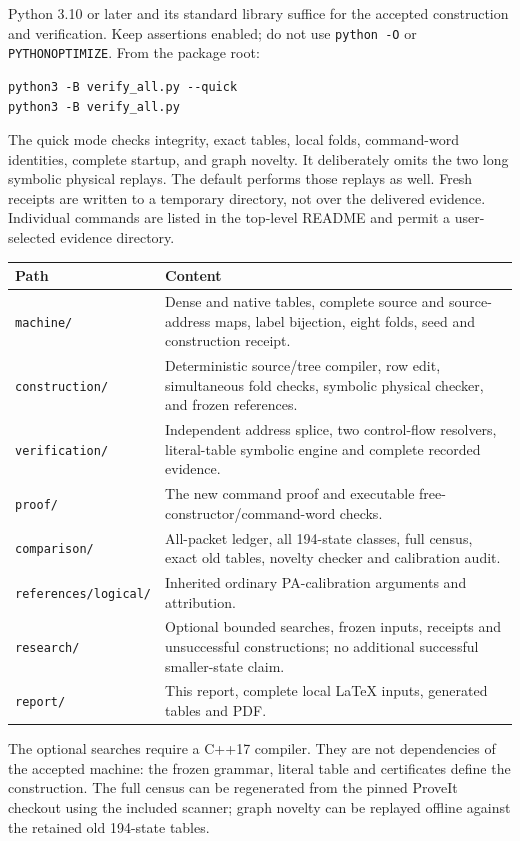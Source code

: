 \documentclass[11pt,letterpaper]{article}
\newcommand{\file}[1]{\texttt{\nolinkurl{#1}}}
\begin{document}
Python 3.10 or later and its standard library suffice for the accepted
construction and verification. Keep assertions enabled; do not use
\file{python -O} or \file{PYTHONOPTIMIZE}. From the package root:
\begin{verbatim}
python3 -B verify_all.py --quick
python3 -B verify_all.py
\end{verbatim}
The quick mode checks integrity, exact tables, local folds, command-word
identities, complete startup, and graph novelty. It deliberately omits
the two long symbolic physical replays. The default performs those
replays as well. Fresh receipts are written to a temporary directory,
not over the delivered evidence. Individual commands are listed in the
top-level README and permit a user-selected evidence directory.

\begin{center}\small
\begin{tabularx}{\linewidth}{@{}lX@{}}
\toprule
Path & Content\\\midrule
\file{machine/} & Dense and native tables, complete source and source-address maps, label bijection, eight folds, seed and construction receipt.\\
\file{construction/} & Deterministic source/tree compiler, row edit, simultaneous fold checks, symbolic physical checker, and frozen references.\\
\file{verification/} & Independent address splice, two control-flow resolvers, literal-table symbolic engine and complete recorded evidence.\\
\file{proof/} & The new command proof and executable free-constructor/command-word checks.\\
\file{comparison/} & All-packet ledger, all 194-state classes, full census, exact old tables, novelty checker and calibration audit.\\
\file{references/logical/} & Inherited ordinary PA-calibration arguments and attribution.\\
\file{research/} & Optional bounded searches, frozen inputs, receipts and unsuccessful constructions; no additional successful smaller-state claim.\\
\file{report/} & This report, complete local LaTeX inputs, generated tables and PDF.\\
\bottomrule
\end{tabularx}
\end{center}

The optional searches require a C++17 compiler. They are not dependencies
of the accepted machine: the frozen grammar, literal table and certificates
define the construction. The full census can be regenerated from the
pinned ProveIt checkout using the included scanner; graph novelty can be
replayed offline against the retained old 194-state tables.
\end{document}

